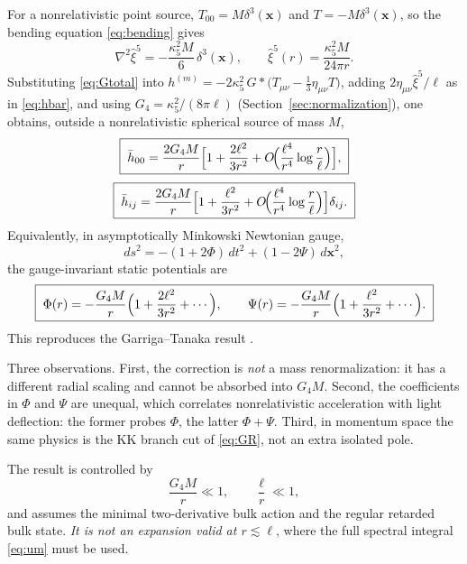 \documentclass[11pt,a4paper]{article}
\theoremstyle{plain}
\theoremstyle{definition}
\newcommand{\kfive}{\kappa_5}
\begin{document}
For a nonrelativistic point source, $T_{00}=M\delta^3(\mathbf x)$ and
$T=-M\delta^3(\mathbf x)$, so the bending equation \eqref{eq:bending}
gives
\begin{equation}
\label{eq:xi5}
\nabla^2\hat\xi^5=-\frac{\kfive^2M}{6}\,\delta^3(\mathbf x),
\qquad
\hat\xi^5(r)=\frac{\kfive^2M}{24\pi r} .
\end{equation}
Substituting \eqref{eq:Gtotal} into
$h^{(m)}=-2\kfive^2\,G*\bigl(T_{\mu\nu}-\tfrac13\eta_{\mu\nu}T\bigr)$,
adding $2\eta_{\mu\nu}\hat\xi^5/\ell$ as in \eqref{eq:hbar}, and using
$G_4=\kfive^2/(8\pi\ell)$ (Section~\ref{sec:normalization}), one obtains,
outside a nonrelativistic spherical source of mass $M$,
\begin{equation}
\label{eq:h00}
\boxed{\;
\bar h_{00}
=\frac{2G_4M}{r}
\Bigl[1+\frac{2\ell^2}{3r^2}
+O\!\Bigl(\frac{\ell^4}{r^4}\log\frac r\ell\Bigr)\Bigr],
\;}
\end{equation}
\begin{equation}
\label{eq:hij}
\boxed{\;
\bar h_{ij}
=\frac{2G_4M}{r}
\Bigl[1+\frac{\ell^2}{3r^2}
+O\!\Bigl(\frac{\ell^4}{r^4}\log\frac r\ell\Bigr)\Bigr]\delta_{ij}.
\;}
\end{equation}
Equivalently, in asymptotically Minkowski Newtonian gauge,
\begin{equation}
\label{eq:newtoniangauge}
ds^2=-(1+2\Phi)\,dt^2+(1-2\Psi)\,d\mathbf x^2,
\end{equation}
the gauge-invariant static potentials are
\begin{equation}
\label{eq:potentials}
\boxed{\;
\Phi(r)=-\frac{G_4M}{r}
\Bigl(1+\frac{2\ell^2}{3r^2}+\cdots\Bigr),
\qquad
\Psi(r)=-\frac{G_4M}{r}
\Bigl(1+\frac{\ell^2}{3r^2}+\cdots\Bigr).
\;}
\end{equation}
This reproduces the Garriga--Tanaka result \cite{GarrigaTanaka}.

Three observations. First, the correction is \emph{not} a mass
renormalization: it has a different radial scaling and cannot be absorbed
into $G_4M$. Second, the coefficients in $\Phi$ and $\Psi$ are unequal,
which correlates nonrelativistic acceleration with light deflection: the
former probes $\Phi$, the latter $\Phi+\Psi$. Third, in momentum space
the same physics is the KK branch cut of \eqref{eq:GR}, not an extra
isolated pole.

The result is controlled by
\begin{equation}
\label{eq:controlconds}
\frac{G_4M}{r}\ll1,
\qquad
\frac{\ell}{r}\ll1 ,
\end{equation}
and assumes the minimal two-derivative bulk action and the regular
retarded bulk state. \emph{It is not an expansion valid at
$r\lesssim\ell$}, where the full spectral integral \eqref{eq:um} must be
used.
\end{document}
